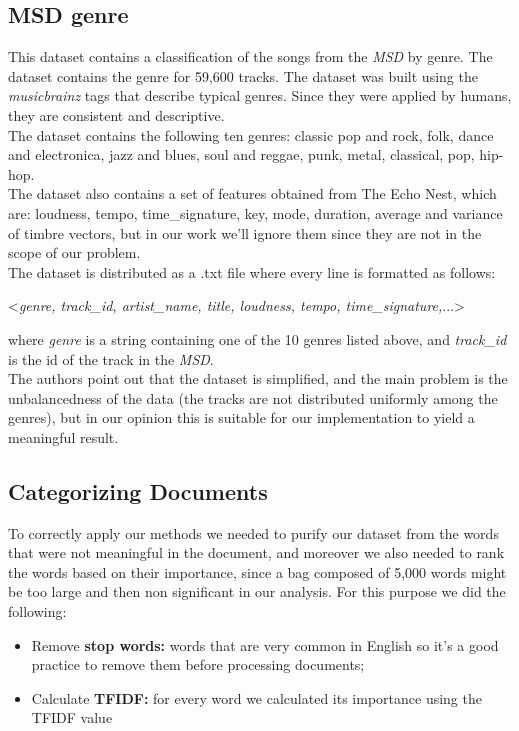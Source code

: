 \documentclass[a4paper, 11pt]{article} %
\begin{document}
\subsection*{MSD genre}
This dataset contains a classification of the songs from the \textit{MSD} by genre. The dataset contains the genre for 59,600 tracks. The dataset was built using the \textit{musicbrainz} tags that describe typical genres. Since they were applied by humans, they are consistent and descriptive.\\
The dataset contains the following ten genres: classic pop and rock, folk, dance and electronica, jazz and blues, soul and reggae, punk, metal, classical, pop, hip-hop. \\
The dataset also contains a set of features obtained from The Echo Nest, which are: loudness, tempo, time\_signature, key, mode, duration, average and variance of timbre vectors, but in our work we'll ignore them since they are not in the scope of our problem. \\
The dataset is distributed as a .txt file where every line is formatted as follows:
\begin{center}<\textit{genre, track\_id, artist\_name, title, loudness, tempo, time\_signature,}...> \end{center}
where \textit{genre} is a string containing one of the 10 genres listed above, and \textit{track\_id} is the id of the track in the \textit{MSD}. \\
The authors point out that the dataset is simplified, and the main problem is the unbalancedness of the data (the tracks are not distributed uniformly among the genres), but in our opinion this is suitable for our implementation to yield a meaningful result.
\subsection*{Categorizing Documents}
To correctly apply our methods we needed to purify our dataset from the words that were not meaningful in the document, and moreover we also needed to rank the words based on their importance, since a bag composed of 5,000 words might be too large and then non significant in our analysis. For this purpose we did the following:
\begin{itemize}
\item Remove \textbf{stop words: } words that are very common in English so it's a good practice to remove them before processing documents;
\item Calculate \textbf{TFIDF:} for every word we calculated its importance using the TFIDF value
\end{itemize}
\end{document}
